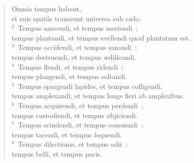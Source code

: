 \begin{flushleft}\begin{verse}\vspace{-19pt}Omnia tempus habent,\\ et suis spatiis transeunt universa sub c\ae lo.\\
${}^{2}$~Tempus nascendi, et tempus moriendi~;\\ tempus plantandi, et tempus evellendi quod plantatum est.\\
${}^{3}$~Tempus occidendi, et tempus sanandi~;\\ tempus destruendi, et tempus \ae dificandi.\\
${}^{4}$~Tempus flendi, et tempus ridendi~;\\ tempus plangendi, et tempus saltandi.\\
${}^{5}$~Tempus spargendi lapides, et tempus colligendi,\\ tempus amplexandi, et tempus longe fieri ab amplexibus.\\
${}^{6}$~Tempus acquirendi, et tempus perdendi~;\\ tempus custodiendi, et tempus abjiciendi.\\
${}^{7}$~Tempus scindendi, et tempus consuendi~;\\ tempus tacendi, et tempus loquendi.\\
${}^{8}$~Tempus dilectionis, et tempus odii~;\\ tempus belli, et tempus pacis.\end{verse}\end{flushleft}


